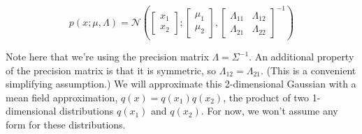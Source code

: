 \documentclass[a3paper,12pt]{extarticle} %
\begin{document}
\[
p(x; \mu, \Lambda) = \mathcal{N} \left( 
\begin{bmatrix}
x_1 \\
x_2
\end{bmatrix}
;
\begin{bmatrix}
\mu_1 \\
\mu_2
\end{bmatrix}
,
\begin{bmatrix}
\Lambda_{11} & \Lambda_{12} \\
\Lambda_{21} & \Lambda_{22}
\end{bmatrix}^{-1}
\right)
\tag{1}
\]

Note here that we’re using the precision matrix \( \Lambda = \Sigma^{-1} \). An additional property of the precision matrix is that it is symmetric, so \( \Lambda_{12} = \Lambda_{21} \). (This is a convenient simplifying assumption.) We will approximate this 2-dimensional Gaussian with a mean field approximation, \( q(x) = q(x_1)q(x_2) \), the product of two 1-dimensional distributions \( q(x_1) \) and \( q(x_2) \). For now, we won’t assume any form for these distributions.
\end{document}
